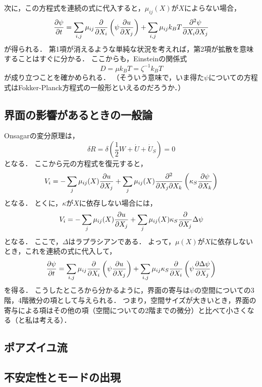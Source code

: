 \documentclass[a4paper,11pt]{jsarticle}
\begin{document}
次に，この方程式を連続の式に代入すると，$\mu_{ij}(X)$が$X$によらない場合，
\begin{equation}
  \pdv{\psi}{t} = \sum_{i,j} \mu_{ij} \pdv{X_i} \left(\psi\pdv{u}{X_j}\right)  + \sum_{i,j} \mu_{ij} k_B T \pdv{\psi}{X_i}{X_j}
\end{equation}
が得られる．
第1項が消えるような単純な状況を考えれば，第2項が拡散を意味することはすぐに分かる．
ここからも，Einsteinの関係式
\begin{equation}
  D = \mu k_B T = \zeta^{-1} k_B T 
\end{equation}
が成り立つことを確かめられる．
（そういう意味で，いま得た$\psi$についての方程式はFokker-Planck方程式の一般形といえるのだろうか．）

\subsection{界面の影響があるときの一般論}
Onsagarの変分原理は，
\begin{equation}
  \delta R = \delta \left(\frac{1}{2} W + \dot{U} + \dot{U}_S\right) = 0
\end{equation}
となる．
ここから元の方程式を復元すると，
\begin{equation}
  V_i = - \sum_{j} \mu_{ij}(X)\pdv{u}{X_j} + \sum_{j} \mu_{ij}(X) \pdv{}{X_j}{X_k} \left(\kappa_S \pdv{\psi}{X_k}\right)
\end{equation}
となる．
とくに，$\kappa$が$X$に依存しない場合には，
\begin{equation}
  V_i = - \sum_{j} \mu_{ij}(X)\pdv{u}{X_j} + \sum_{j} \mu_{ij}(X) \kappa_S \pdv{X_j} \Delta \psi
\end{equation}
となる．
ここで，$\Delta$はラプラシアンである．
よって，$\mu(X)$が$X$に依存しないとき，これを連続の式に代入して，
\begin{equation}
  \pdv{\psi}{t} = \sum_{i,j} \mu_{ij} \pdv{X_i} \left(\psi\pdv{u}{X_j}\right)  + \sum_{i,j} \mu_{ij} \kappa_S \pdv{X_i}\left(\psi\pdv{\Delta \psi}{X_j}\right)
\end{equation}
を得る．
こうしたところから分かるように，界面の寄与は$\psi$の空間についての3階，4階微分の項として与えられる．
つまり，空間サイズが大きいとき，界面の寄与による項はその他の項（空間についての2階までの微分）と比べて小さくなる（と私は考える）．

\subsection{ポアズイユ流}

\subsection{不安定性とモードの出現}
\end{document}
